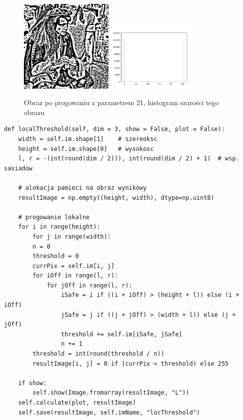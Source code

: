 \documentclass[final,a4paper,openany,12pt]{mwbk}
\begin{document}
\begin{figure}[H]
	\begin{center}
		\includegraphics[width=0.4\textwidth]{pirate_gray_locThreshold_result}
		\includegraphics[width=0.4\textwidth]{pirate_gray_locThreshold_histogram}
	\end{center}
	\caption{Obraz po progowaniu z parametrem 21, histogram szarości tego obrazu}
\end{figure}


\begin{lstlisting}[caption=Progowanie lokalne]
def localThreshold(self, dim = 3, show = False, plot = False):
	width = self.im.shape[1]    # szereoksc
	height = self.im.shape[0]   # wysokosc
	l, r = -(int(round(dim / 2))), int(round(dim / 2) + 1)  # wsp. sasiadow
	
	# alokacja pamieci na obraz wynikowy
	resultImage = np.empty((height, width), dtype=np.uint8)
	
	# progowanie lokalne
	for i in range(height):
		for j in range(width):
		n = 0
		threshold = 0
		currPix = self.im[i, j]
		for iOff in range(l, r):
			for jOff in range(l, r):
				iSafe = i if ((i + iOff) > (height + l)) else (i + iOff)
				jSafe = j if ((j + jOff) > (width + l)) else (j + jOff)
				threshold += self.im[iSafe, jSafe]
				n += 1
		threshold = int(round(threshold / n))
		resultImage[i, j] = 0 if (currPix < threshold) else 255
	
	if show:
		self.show(Image.fromarray(resultImage, "L"))
	self.calculate(plot, resultImage)
	self.save(resultImage, self.imName, "locThreshold")
\end{lstlisting}
\end{document}
